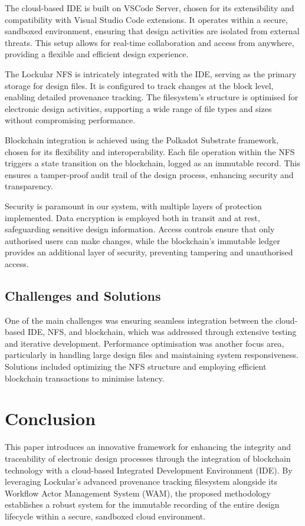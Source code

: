 \documentclass{tufte-handout}
\begin{document}
The cloud-based IDE is built on VSCode Server, chosen for its extensibility and compatibility with Visual Studio Code extensions. It operates within a secure,
sandboxed environment, ensuring that design activities are isolated from external threats. This setup allows for real-time collaboration and access from
anywhere, providing a flexible and efficient design experience.

The Lockular NFS is intricately integrated with the IDE, serving as the primary storage for design files. It is configured to track changes at the block level, enabling
detailed provenance tracking. The filesystem's structure is optimised for electronic design activities, supporting a wide range of file types and sizes without
compromising performance.

Blockchain integration is achieved using the Polkadot Substrate framework, chosen for its flexibility and interoperability. Each file operation within the
NFS triggers a state transition on the blockchain, logged as an immutable record. This ensures a tamper-proof audit trail of the design process, enhancing
security and transparency.

Security is paramount in our system, with multiple layers of protection implemented. Data encryption is employed both in transit and at rest, safeguarding
sensitive design information. Access controls ensure that only authorised users can make changes, while the blockchain's immutable ledger provides an
additional layer of security, preventing tampering and unauthorised access.

\subsection{Challenges and Solutions}
One of the main challenges was ensuring seamless integration between the cloud-based IDE, NFS, and blockchain, which was addressed through extensive
testing and iterative development. Performance optimisation was another focus area, particularly in handling large design files and maintaining
system responsiveness. Solutions included optimizing the NFS structure and employing efficient blockchain transactions to minimise latency.

\section{Conclusion}
This paper introduces an innovative framework for enhancing the integrity and traceability of electronic design processes through the integration of
blockchain technology with a cloud-based Integrated Development Environment (IDE). By leveraging Lockular's advanced provenance tracking filesystem
alongside its Workflow Actor Management System (WAM), the proposed methodology establishes a robust system for the immutable recording of the entire design
lifecycle within a secure, sandboxed cloud environment.
\end{document}
